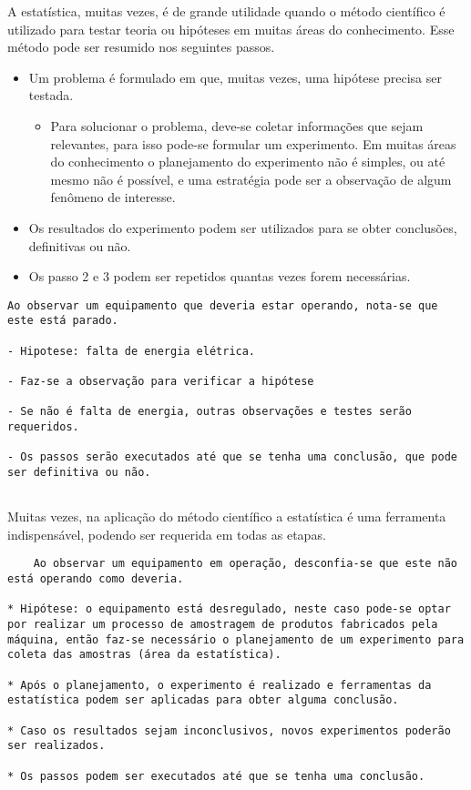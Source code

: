 \documentclass[
]{article}
\providecommand{\tightlist}{%
  \setlength{\itemsep}{0pt}\setlength{\parskip}{0pt}}
\begin{document}
A estatística, muitas vezes, é de grande utilidade quando o método
científico é utilizado para testar teoria ou hipóteses em muitas áreas
do conhecimento. Esse método pode ser resumido nos seguintes passos.

\begin{itemize}
\item
  Um problema é formulado em que, muitas vezes, uma hipótese precisa ser
  testada.

  \begin{itemize}
  \tightlist
  \item
    Para solucionar o problema, deve-se coletar informações que sejam
    relevantes, para isso pode-se formular um experimento. Em muitas
    áreas do conhecimento o planejamento do experimento não é simples,
    ou até mesmo não é possível, e uma estratégia pode ser a observação
    de algum fenômeno de interesse.
  \end{itemize}
\item
  Os resultados do experimento podem ser utilizados para se obter
  conclusões, definitivas ou não.
\item
  Os passo 2 e 3 podem ser repetidos quantas vezes forem necessárias.
\end{itemize}

\begin{verbatim}
Ao observar um equipamento que deveria estar operando, nota-se que este está parado.

- Hipotese: falta de energia elétrica.

- Faz-se a observação para verificar a hipótese

- Se não é falta de energia, outras observações e testes serão requeridos.

- Os passos serão executados até que se tenha uma conclusão, que pode ser definitiva ou não.
        
\end{verbatim}

Muitas vezes, na aplicação do método científico a estatística é uma
ferramenta indispensável, podendo ser requerida em todas as etapas.

\begin{verbatim}
    Ao observar um equipamento em operação, desconfia-se que este não está operando como deveria.

* Hipótese: o equipamento está desregulado, neste caso pode-se optar por realizar um processo de amostragem de produtos fabricados pela máquina, então faz-se necessário o planejamento de um experimento para coleta das amostras (área da estatística).

* Após o planejamento, o experimento é realizado e ferramentas da estatística podem ser aplicadas para obter alguma conclusão.

* Caso os resultados sejam inconclusivos, novos experimentos poderão ser realizados.

* Os passos podem ser executados até que se tenha uma conclusão.
\end{verbatim}
\end{document}
